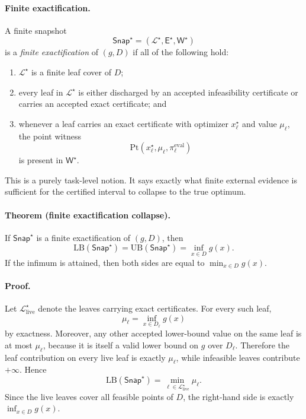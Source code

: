 \paragraph{Finite exactification.}
A finite snapshot
\[
\mathsf{Snap}^\star=(\mathcal L^\star,\mathsf E^\star,\mathsf W^\star)
\]
is a \emph{finite exactification} of $(g,D)$ if all of the following hold:
\begin{enumerate}
    \item $\mathcal L^\star$ is a finite leaf cover of $D$;
    \item every leaf in $\mathcal L^\star$ is either discharged by an accepted infeasibility certificate or carries an accepted exact certificate; and
    \item whenever a leaf carries an exact certificate with optimizer $x_\ell^\star$ and value $\mu_\ell$, the point witness
    \[
    \mathrm{Pt}(x_\ell^\star,\mu_\ell,\pi_\ell^{\mathrm{eval}})
    \]
    is present in $\mathsf W^\star$.
\end{enumerate}
This is a purely task-level notion. It says exactly what finite external evidence is sufficient for the certified interval to collapse to the true optimum.

\paragraph{\normalfont Theorem (finite exactification collapse).}
If $\mathsf{Snap}^\star$ is a finite exactification of $(g,D)$, then
\begin{equation}
\mathrm{LB}(\mathsf{Snap}^\star)
=
\mathrm{UB}(\mathsf{Snap}^\star)
=
\inf_{x\in D} g(x).
\label{eq:appAnew-collapse}
\end{equation}
If the infimum is attained, then both sides are equal to $\min_{x\in D} g(x)$.

\paragraph{\normalfont Proof.}
Let $\mathcal L_{\mathrm{live}}^\star$ denote the leaves carrying exact certificates. For every such leaf,
\[
\mu_\ell=\inf_{x\in D_\ell} g(x)
\]
by exactness. Moreover, any other accepted lower-bound value on the same leaf is at most $\mu_\ell$, because it is itself a valid lower bound on $g$ over $D_\ell$. Therefore the leaf contribution on every live leaf is exactly $\mu_\ell$, while infeasible leaves contribute $+\infty$. Hence
\[
\mathrm{LB}(\mathsf{Snap}^\star)
=
\min_{\ell\in \mathcal L_{\mathrm{live}}^\star} \mu_\ell.
\]
Since the live leaves cover all feasible points of $D$, the right-hand side is exactly $\inf_{x\in D} g(x)$.

